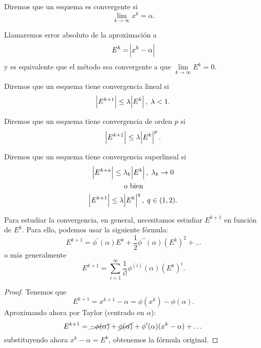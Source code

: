 \begin{defi}
    Diremos que un esquema es convergente si
    \[
        \lim_{k \to \infty} x^k = \alpha.
    \]
\end{defi}

\begin{defi}
    Llamaremos error absoluto de la aproximación a 
    \[
        E^k = \abs{x^k - \alpha}
    \]
    y es equivalente que el método sea convergente a que $\lim\limits_{k \to \infty} E^k = 0$.
\end{defi}

\begin{defi}
    Diremos que un esquema tiene convergencia lineal si
    \[
        \abs{E^{k+1}} \leq \lambda \abs{E^k}, \; \lambda < 1.
    \]
\end{defi}

\begin{defi}
    Diremos que un esquema tiene convergencia de orden $p$ si
    \[
        \abs{E^{k+1}} \leq \lambda \abs{E^k}^p.
    \]
\end{defi}

\begin{defi}
    Diremos que un esquema tiene convergencia superlineal si
    \begin{gather*}
        \abs{E^{k+a}} \leq \lambda_k \abs{E^k}, \; \lambda_k \to 0 \\
        \text{o bien} \\
        \abs{E^{k+1}} \leq \lambda \abs{E^k}^q, \; q \in (1, 2).
    \end{gather*}
\end{defi}

\begin{prop}
    Para estudiar la convergencia, en general, necesitamos estudiar $E^{k+1}$ en función de $E^k$.
    Para ello, podemos usar la siguiente fórmula:
    \[
        E^{k+1} = \phi^\prime(\alpha)E^k + \frac{1}{2} \phi^{\prime \prime}(\alpha)\left( E^k \right)^2 + \dots
    \]
    o más generalmente
    \[
        E^{k+1} = \sum^{\infty}_{i = 1} \frac{1}{i!} \phi^{(i)}(\alpha) \left( E^k \right)^i.
    \]
\end{prop}

\begin{proof}
    Tenemos que
    \[
        E^{k+1} = x^{k+1} - \alpha = \phi(x^k) - \phi(\alpha).
    \]
    Aproximando ahora por Taylor (centrado en $\alpha$):
    \[
        E^{k+1} = \cancel{-\phi(\alpha)} + \cancel{\phi(\alpha)} + \phi^\prime(\alpha)(x^k - \alpha) + \dots
    \]
    substituyendo ahora $x^k - \alpha = E^k$, obtenemos la fórmula original.
\end{proof}

